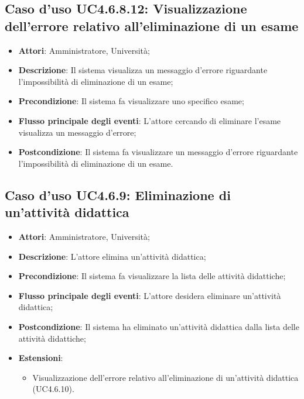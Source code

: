\subsection{Caso d'uso \texorpdfstring{UC4.6.8.12}{UC4.6.8.12}: Visualizzazione dell'errore relativo all'eliminazione di un esame}
\begin{itemize}
	\item \textbf{Attori}: Amministratore, Università;
	\item \textbf{Descrizione}: Il sistema visualizza un messaggio d'errore riguardante l'impossibilità di eliminazione di un esame;
	\item \textbf{Precondizione}: Il sistema fa visualizzare uno specifico esame;
	
	\item \textbf{Flusso principale degli eventi}: L'attore cercando di eliminare l'esame visualizza un messaggio d'errore;
	\item \textbf{Postcondizione}: Il sistema fa visualizzare un messaggio d'errore riguardante l'impossibilità di eliminazione di un esame.
\end{itemize}
\subsection{Caso d'uso \texorpdfstring{UC4.6.9}{UC4.6.9}: Eliminazione di un'attività didattica}
\begin{itemize}
	\item \textbf{Attori}: Amministratore, Università;
	\item \textbf{Descrizione}: L'attore elimina un'attività didattica;
	
	\item \textbf{Precondizione}: Il sistema fa visualizzare la lista delle attività didattiche;
	
	\item \textbf{Flusso principale degli eventi}: L'attore desidera eliminare un'attività didattica;
	
	\item \textbf{Postcondizione}: Il sistema ha eliminato un'attività didattica dalla lista delle attività didattiche;
	
	\item \textbf{Estensioni}:
	\begin{itemize}
		\item Visualizzazione dell'errore relativo all'eliminazione di un'attività didattica (UC4.6.10).
	\end{itemize}
\end{itemize}
